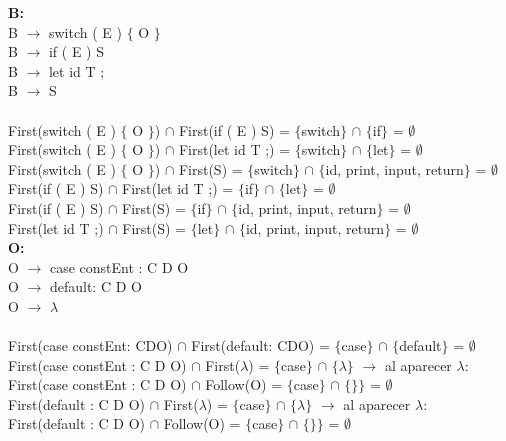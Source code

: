 \documentclass{article}[a4paper]
\newcommand\tab[1][1cm]{\hspace*{#1}}
\begin{document}
\textbf{B:}\\
\tab B $\rightarrow$ switch ( E ) $\lbrace$ O $\rbrace$\\
\tab B $\rightarrow$ if ( E ) S \\
\tab B $\rightarrow$ let id T ;\\
\tab B $\rightarrow$ S\\ \\
\tab \tab First(switch ( E ) $\lbrace$ O $\rbrace$) $\cap$ First(if ( E ) S) = $\lbrace$switch$\rbrace$ $\cap$ $\lbrace$if$\rbrace$ = $\emptyset$\\
\tab \tab First(switch ( E ) $\lbrace$ O $\rbrace$) $\cap$ First(let id T ;) = $\lbrace$switch$\rbrace$ $\cap$ $\lbrace$let$\rbrace$ = $\emptyset$\\
\tab \tab First(switch ( E ) $\lbrace$ O $\rbrace$) $\cap$ First(S) = $\lbrace$switch$\rbrace$ $\cap$ $\lbrace$id, print, input, return$\rbrace$ = $\emptyset$\\
\tab \tab First(if ( E ) S) $\cap$ First(let id T ;) = $\lbrace$if$\rbrace$ $\cap$ $\lbrace$let$\rbrace$ = $\emptyset$\\
\tab \tab First(if ( E ) S) $\cap$ First(S) = $\lbrace$if$\rbrace$ $\cap$ $\lbrace$id, print, input, return$\rbrace$ = $\emptyset$\\
\tab \tab First(let id T ;) $\cap$ First(S) = $\lbrace$let$\rbrace$ $\cap$ $\lbrace$id, print, input, return$\rbrace$ = $\emptyset$\\

\textbf{O:}\\
\tab O $\rightarrow$ case constEnt : C D O\\
\tab O $\rightarrow$ default: C D O\\
\tab O $\rightarrow$ $\lambda$\\ \\
\tab \tab First(case constEnt: CDO) $\cap$ First(default: CDO) = $\lbrace$case$\rbrace$ $\cap$ $\lbrace$default$\rbrace$ = $\emptyset$\\
\tab \tab First(case constEnt : C D O) $\cap$ First($\lambda$) = $\lbrace$case$\rbrace$ $\cap$ $\lbrace$$\lambda$$\rbrace$ $\rightarrow$ al aparecer $\lambda$:\\
\tab \tab First(case constEnt : C D O) $\cap$ Follow(O) = $\lbrace$case$\rbrace$ $\cap$ $\lbrace$$\rbrace$$\rbrace$ = $\emptyset$\\
\tab \tab First(default : C D O) $\cap$ First($\lambda$) = $\lbrace$case$\rbrace$ $\cap$ $\lbrace$$\lambda$$\rbrace$ $\rightarrow$ al aparecer $\lambda$:\\
\tab \tab First(default : C D O) $\cap$ Follow(O) = $\lbrace$case$\rbrace$ $\cap$ $\lbrace$$\rbrace$$\rbrace$ = $\emptyset$\\
\end{document}
